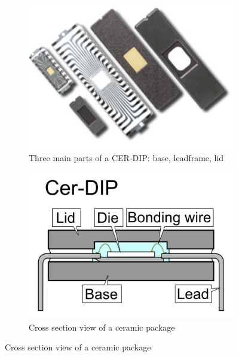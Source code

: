 \documentclass[final]{cubedoc}
\begin{document}

\begin{figure}[h!]
\centering
\begin{subfigure}{.5\textwidth}
  \centering
    \includegraphics[height=0.2\textheight, width=\textwidth, keepaspectratio]{docs/cer_dip_real.png}
  \caption{Three main parts of a CER-DIP: base, leadframe, lid}
  \label{fig:sub1}
\end{subfigure}%
\begin{subfigure}{.5\textwidth}
  \centering
    \includegraphics[height=0.2\textheight, width=\textwidth, keepaspectratio]{docs/cdip.PNG}
  \caption{Cross section view of a ceramic package}
  \label{fig:sub2}
\end{subfigure}
\label{fig:test}
\end{figure}
\end{document}
